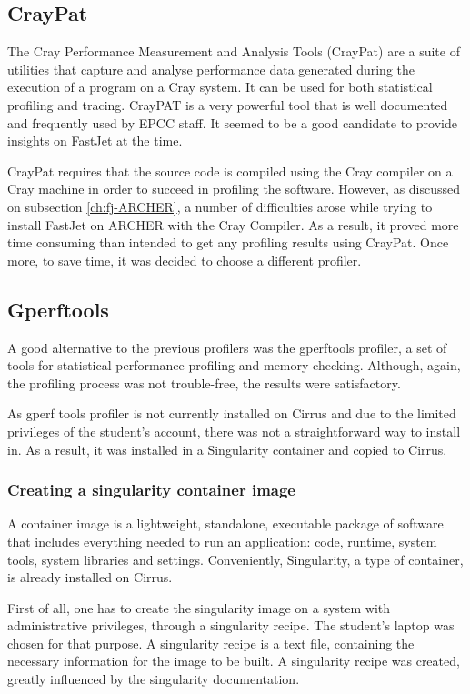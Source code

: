 \subsection{CrayPat}\label{ch:craypat}
The Cray Performance Measurement and Analysis Tools (CrayPat) are a suite of utilities that capture and analyse performance data generated during the execution of a program on a Cray system\cite{craypat}. It can be used for both statistical profiling and tracing. CrayPAT is a very powerful tool that is well documented and frequently used by EPCC staff. It seemed to be a good candidate to provide insights on FastJet at the time. 

CrayPat requires that the source code is compiled using the Cray compiler on a Cray machine in order to succeed in profiling the software. However, as discussed on subsection \ref{ch:fj-ARCHER}, a number of difficulties arose while trying to install FastJet on ARCHER with the Cray Compiler. As a result, it proved more time consuming than intended to get any profiling results using CrayPat. Once more, to save time, it was decided to choose a different profiler.

\subsection{Gperftools}
A good alternative to the previous profilers was the gperftools profiler\cite{gperf}, a set of tools for statistical performance profiling and memory checking. Although, again, the profiling process was not trouble-free, the results were satisfactory. 

As gperf tools profiler is not currently installed on Cirrus and due to the limited privileges of the student's account, there was not a straightforward way to install in. As a result, it was installed in a Singularity container and copied to Cirrus. 

\subsubsection{Creating a singularity container image}\label{ch:singularity}
A container image is a lightweight, standalone, executable package of software that includes everything needed to run an application: code, runtime, system tools, system libraries and settings. Conveniently, Singularity\cite{kurtzer2017singularity}, a type of container, is already installed on Cirrus. 

First of all, one has to create the singularity image on a system with administrative privileges, through a singularity recipe. The student's laptop was chosen for that purpose. A singularity recipe is a text file, containing the necessary information for the image to be built. A singularity recipe was created, greatly influenced by the singularity documentation.

